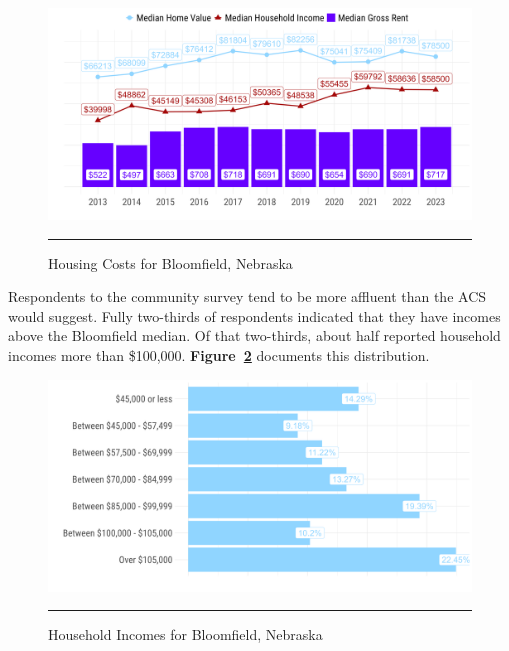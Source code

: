 \begin{figure}[H]
\centering
\begin{framed}
    \caption{Housing Costs for Bloomfield, Nebraska}
    \label{fig:housingCosts}
    \includegraphics[width=\linewidth]{figures/housing_costs.png}
    \rule[-5pt]{\linewidth}{0.4pt}
\end{framed}
\end{figure}

\pagebreak
\noindent Respondents to the community survey tend to be more affluent than the ACS would suggest. Fully two-thirds of respondents indicated that they have incomes above the Bloomfield median. Of that two-thirds, about half reported household incomes more than \$100,000. \textbf{Figure~\ref{fig:householdIncomes}} documents this distribution.

\begin{figure}[H]
\centering
\begin{framed}
    \caption{Household Incomes for Bloomfield, Nebraska}
    \label{fig:householdIncomes}
    \includegraphics[width=\linewidth]{figures/survey_respondent_incomes.png}
    \rule[-5pt]{\linewidth}{0.4pt}
\end{framed}
\end{figure}

